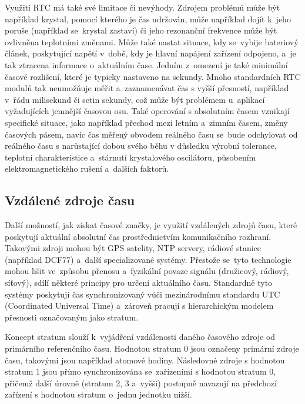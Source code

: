 Využití RTC má také své limitace či nevýhody. Zdrojem problémů může být například krystal, pomocí kterého je čas udržován, může například dojít k~jeho poruše (například se~krystal zastaví) či jeho rezonanční frekvence může být ovlivněna teplotními změnami. Může také nastat situace, kdy se~vybije bateriový článek, poskytující napětí v~době, kdy je hlavní napájení zařízení odpojeno, a~je tak ztracena informace o~aktuálním čase. Jedním z~omezení je také minimální časové rozlišení, které je typicky nastaveno na sekundy. Mnoho standardních RTC modulů tak neumožňuje měřit a~zaznamenávat čas s vyšší přesností, například v~řádu milisekund či setin sekundy, což může být problémem u~aplikací vyžadujících jemnější časovou osu. Také operování s absolutním časem vznikají specifické situace, jako například přechod mezi letním a~zimním časem, změny časových pásem, navíc čas měřený obvodem reálného času se~bude odchylovat od reálného času s narůstající dobou svého běhu v důsledku  výrobní tolerance, teplotní charakteristice a~stárnutí krystalového oscilátoru, působením elektromagnetického rušení a~dalších faktorů.~\cite{jameco_choosing_right_real_time_clock_chip_or_module, embed_journal_interfacing_rtc_with_microcontroler, medium_rtc, ti_rtc}

\subsection{Vzdálené zdroje času}
Další možností, jak získat časové značky, je využití vzdálených zdrojů času, které poskytují aktuální absolutní čas prostřednictvím komunikačního rozhraní. Takovými zdroji mohou být GPS satelity, NTP servery, rádiové stanice (například DCF77) a~další specializované systémy. Přestože se~tyto technologie mohou lišit ve~způsobu přenosu a~fyzikální povaze signálu (družicový, rádiový, síťový), sdílí některé principy pro určení aktuálního času. Standardně tyto systémy poskytují čas synchronizovaný vůči mezinárodnímu standardu UTC (Coordinated Universal Time) a~zároveň pracují s hierarchickým modelem přesnosti označovaným jako stratum.~\cite{sparkfun_gps, sookocheff_ntp}

Koncept stratum slouží k~vyjádření vzdálenosti daného časového zdroje od primárního referenčního času. Hodnotou stratum 0 jsou označeny primární zdroje času, takovými jsou například atomové hodiny. Následovné zdroje s hodnotou stratum 1 jsou přímo synchronizována se~zařízeními s hodnotou stratum 0, přičemž další úrovně (stratum 2, 3 a~vyšší) postupně navazují na předchozí zařízení s hodnotou stratum o~jednu jednotku nižší.~\cite{sookocheff_ntp}

